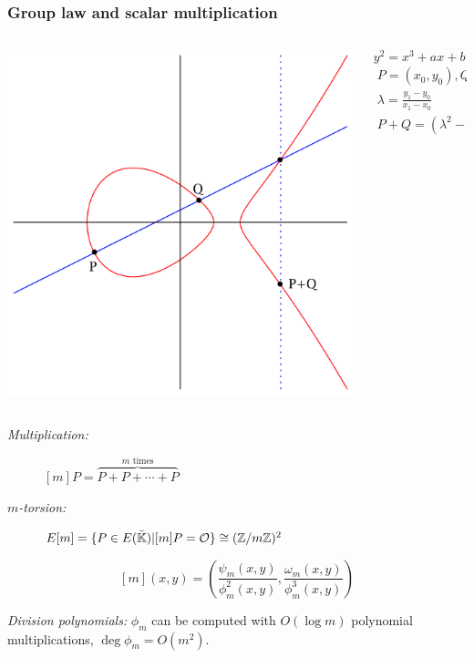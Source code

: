 \documentclass[10pt,usepdftitle=false]{beamer}
\begin{document}

\begin{frame}
  \frametitle{Group law and scalar multiplication}
  
  \begin{columns}
    \begin{column}{0.3\textwidth}
      \includegraphics[width=\textwidth]{../isogeny/ec-add.pdf}
    \end{column}
    \begin{column}{0.55\textwidth}
      {\large\emph{\[y^2 = x^3 + ax + b\]}}
      \begin{gather*}
        P = (x_0, y_0), Q = (x_1, y_1)\\
        \lambda = \frac{y_1 - y_0}{x_1 - x_0}\\
        P+Q = (\lambda^2 - x_0 - x_1, (x_0 - x_2)\lambda - y_0)
      \end{gather*}
    \end{column}
  \end{columns}

  {\large
    \begin{description}
    \item[\emph{Multiplication:}] $[m]P = \overbrace{P + P + \cdots + P}^{\text{$m$ times}}$
    \item[\emph{$m$-torsion:}] $E[m] = \{P\in E(\bar{\mathbb{K}}) | [m]P=\mathcal{O}\} \cong (\mathbb{Z}/m\mathbb{Z})^2$
    \end{description}}
  
  \[[m](x,y) = \left(\frac{\psi_m(x,y)}{\phi_m^2(x,y)}, \frac{\omega_m(x,y)}{\phi_m^3(x,y)}\right)\]
  
  \emph{Division polynomials:} $\phi_m$ can be computed with $O(\log
  m)$ polynomial multiplications, $\deg\phi_m=O(m^2)$.
\end{frame}
\end{document}
